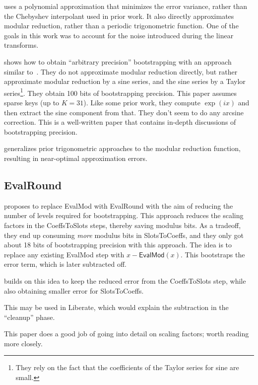 \documentclass[../fheimpl.tex]{subfiles}
\begin{document}
    \cite{cryptoeprint:2020/1549} uses a polynomial approximation that minimizes the error variance, rather than the Chebyshev interpolant used in prior work. It also directly approximates modular reduction, rather than a periodic trigonometric function. One of the goals in this work was to account for the noise introduced during the linear transforms.
    
    \cite{cryptoeprint:2021/572} shows how to obtain ``arbitrary precision'' bootstrapping with an approach similar to~\cite{cryptoeprint:2018/153}. They do not approximate modular reduction directly, but rather approximate modular reduction by a sine series, and the sine series by a Taylor series\footnote{They rely on the fact that the coefficients of the Taylor series for sine are small.}. They obtain 100 bits of bootstrapping precision. This paper assumes sparse keys (up to $K=31$). Like some prior work, they compute $\exp(ix)$ and then extract the sine component from that. They don't seem to do any arcsine correction. This is a well-written paper that contains in-depth discussions of bootstrapping precision.

    \cite{cryptoeprint:2025/429} generalizes prior trigonometric approaches to the modular reduction function, resulting in near-optimal approximation errors. 
	
    \subsection{EvalRound}
    \cite{cryptoeprint:2022/1256} proposes to replace EvalMod with EvalRound with the aim of reducing the number of levels required for bootstrapping. This approach reduces the scaling factors in the CoeffsToSlots steps, thereby saving modulus bits. As a tradeoff, they end up consuming \emph{more} modulus bits in SlotsToCoeffs, and they only got about 18 bits of bootstrapping precision with this approach. The idea is to replace any existing EvalMod step with $x-\mathsf{EvalMod}(x)$. This bootstraps the error term, which is later subtracted off.

    \cite{cryptoeprint:2024/1379} builds on this idea to keep the reduced error from the CoeffsToSlots step, while also obtaining smaller error for SlotsToCoeffs.
    
    This may be used in Liberate, which would explain the subtraction in the ``cleanup'' phase.
    
    This paper does a good job of going into detail on scaling factors; worth reading more closely.
    
\end{document}
